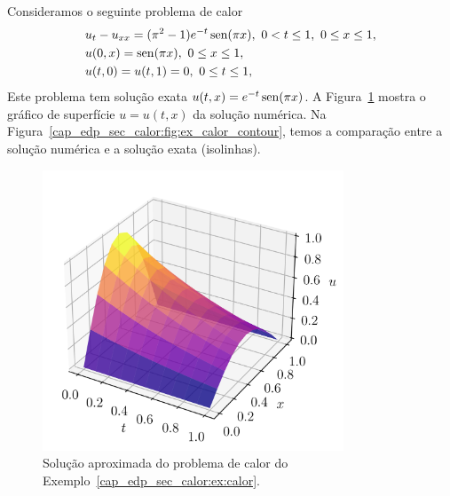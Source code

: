 \begin{ex}\label{cap_edp_sec_calor:ex:calor}
  Consideramos o seguinte problema de calor
  \begin{subequations}
    \begin{align}
      &u_t - u_{xx} = (\pi^2 - 1)e^{-t}\operatorname{sen}(\pi x), ~0 < t \leq 1, ~0\leq x \leq 1,\\
      &u(0,x) = \operatorname{sen}(\pi x), ~0 \leq x \leq 1,\\
      &u(t,0) = u(t,1) = 0, ~ 0 \leq t \leq 1,
    \end{align}
  \end{subequations}
  Este problema tem solução exata $u(t,x) = e^{-t}\operatorname{sen}(\pi x)$. A Figura~\ref{cap_edp_sec_calor:fig:ex_calor_surface} mostra o gráfico de superfície $u = u(t,x)$ da solução numérica. Na Figura~\ref{cap_edp_sec_calor:fig:ex_calor_contour}, temos a comparação entre a solução numérica e a solução exata (isolinhas).

  \begin{figure}[H]
    \centering
    \includegraphics[width=0.8\textwidth]{./cap_edp/dados/fig_ex_calor/fig_surface}
    \caption{Solução aproximada do problema de calor do Exemplo~\ref{cap_edp_sec_calor:ex:calor}.}
    \label{cap_edp_sec_calor:fig:ex_calor_surface}
  \end{figure}
  

\end{ex}

